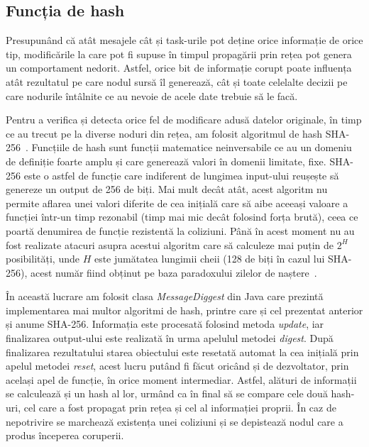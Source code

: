 \documentclass[12pt,a4paper]{report}
\begin{document}
\subsection{Funcția de hash} \label{hash}
Presupunând că atât mesajele cât și task-urile pot deține orice informație de orice tip, modificările la care pot fi supuse în timpul propagării prin rețea pot genera un comportament nedorit. Astfel, orice bit de informație corupt poate influența atât rezultatul pe care nodul sursă îl generează, cât și toate celelalte decizii pe care nodurile întâlnite ce au nevoie de acele date trebuie să le facă.

Pentru a verifica și detecta orice fel de modificare adusă datelor originale, în timp ce au trecut pe la diverse noduri din rețea, am folosit algoritmul de hash SHA-256~\cite{sha256}. Funcțiile de hash sunt funcții matematice neinversabile ce au un domeniu de definiție foarte amplu și care generează valori în domenii limitate, fixe. SHA-256 este o astfel de funcție care indiferent de lungimea input-ului reușește să genereze un output de 256 de biți. Mai mult decât atât, acest algoritm nu permite aflarea unei valori diferite de cea inițială care să aibe aceeași valoare a funcției într-un timp rezonabil (timp mai mic decât folosind forța brută), ceea ce poartă denumirea de funcție rezistentă la coliziuni. Până în acest moment nu au fost realizate atacuri asupra acestui algoritm care să calculeze mai puțin de $2^H$ posibilități, unde $H$ este jumătatea lungimii cheii (128 de biți în cazul lui SHA-256), acest număr fiind obținut pe baza paradoxului zilelor de naștere~\cite{birthdayParadox}. 

În această lucrare am folosit clasa \textit{MessageDiggest} din Java care prezintă implementarea mai multor algoritmi de hash, printre care și cel prezentat anterior și anume SHA-256. Informația este procesată folosind metoda \textit{update}, iar finalizarea output-ului este realizată în urma apelulul metodei \textit{digest}. După finalizarea rezultatului starea obiectului este resetată automat la cea inițială prin apelul metodei \textit{reset}, acest lucru putând fi făcut oricând și de dezvoltator, prin același apel de funcție, în orice moment intermediar. Astfel, alături de informații se calculează și un hash al lor, urmând ca în final să se compare cele două hash-uri, cel care a fost propagat prin rețea și cel al informației proprii. În caz de nepotrivire se marchează existența unei coliziuni și se depistează nodul care a produs începerea coruperii.  
\end{document}
